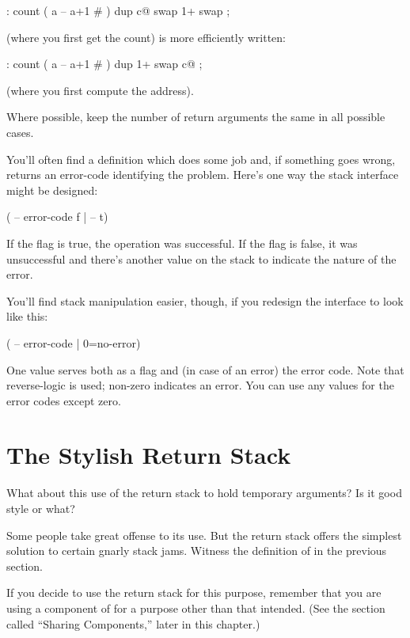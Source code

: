 \begin{Code}
: count  ( a -- a+1 # )  dup c@  swap 1+  swap ;
\end{Code}
(where you first get the count) is more efficiently written:

\begin{Code}
: count  ( a -- a+1 # )  dup 1+  swap c@ ;
\end{Code}
(where you first compute the address).
\goodbreak

\begin{tip}
Where possible, keep the number of return arguments the same in all
possible cases.
\end{tip}%
You'll often find a definition which does some job and, if something goes
wrong, returns an error-code identifying the problem. Here's one way
the stack interface might be designed:

\begin{Code}
( -- error-code f | -- t)
\end{Code}
If the flag is true, the operation was successful. If the flag is false,
it was unsuccessful and there's another value on the stack to indicate the
nature of the error.

You'll find stack manipulation easier, though, if you redesign the interface
to look like this:

\begin{Code}
( -- error-code | 0=no-error)
\end{Code}
One value serves both as a flag and (in case of an error) the error code.
Note that reverse-logic is used; non-zero indicates an error. You can use
any values for the error codes except zero.%
%

\section{The Stylish Return Stack}%

What about this use of the return stack to hold temporary arguments? Is
it good style or what?

Some people take great offense to its use. But the return stack
offers the simplest solution to certain gnarly stack jams. Witness the
definition of  in the previous section.

If you decide to use the return stack for this purpose, remember
that you are using a component of \Forth{} for a purpose other than that
intended. (See the section called ``Sharing Components,'' later in this
chapter.)

